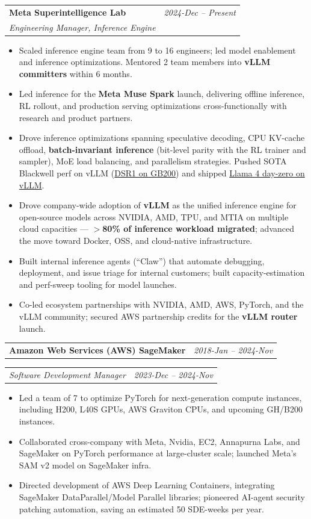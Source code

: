 \documentclass[letterpaper,10pt]{article}
\makeatletter
\newcommand{\resumeSubheading}[4]{
  \vspace{-1pt}\item
    \begin{tabular*}{0.97\textwidth}[t]{l@{\extracolsep{\fill}}r}
      \textbf{#1} & \textit{#2} \\
      \textit{\small#3} & \textit{\small#4} \\
    \end{tabular*}\vspace{-5pt}
}
\newcommand{\resumeSubSubheading}[2]{
  \vspace{-1pt}\item
    \begin{tabular*}{0.97\textwidth}[t]{l@{\extracolsep{\fill}}r}
      \textit{\small#1} & \textit{\small#2} \\
    \end{tabular*}\vspace{-5pt}
}
\newcommand{\resumeCompanyHeading}[2]{
  \vspace{-1pt}\item
    \begin{tabular*}{0.97\textwidth}[t]{l@{\extracolsep{\fill}}r}
      \textbf{#1} & \textit{#2}
    \end{tabular*}\vspace{-5pt}
}
\newcommand{\resumeItemListStart}{\begin{itemize}[topsep=2pt,itemsep=1pt,parsep=0pt]}
\newcommand{\resumeItemListEnd}{\end{itemize}\vspace{-3pt}}
\makeatother
\begin{document}
    \resumeSubheading
      {Meta Superintelligence Lab}{2024-Dec -- Present}
      {Engineering Manager, Inference Engine}{}
      \resumeItemListStart
        \item Scaled inference engine team from 9 to 16 engineers; led model enablement and inference optimizations. Mentored 2 team members into \textbf{vLLM committers} within 6 months.
        \item Led inference for the \textbf{Meta Muse Spark} launch, delivering offline inference, RL rollout, and production serving optimizations cross-functionally with research and product partners.
        \item Drove inference optimizations spanning speculative decoding, CPU KV-cache offload, \textbf{batch-invariant inference} (bit-level parity with the RL trainer and sampler), MoE load balancing, and parallelism strategies. Pushed SOTA Blackwell perf on vLLM (\href{https://vllm.ai/blog/dsr1-gb200-part1}{DSR1 on GB200}) and shipped \href{https://vllm-project.github.io/2025/04/05/llama4.html}{Llama 4 day-zero on vLLM}.
        \item Drove company-wide adoption of \textbf{vLLM} as the unified inference engine for open-source models across NVIDIA, AMD, TPU, and MTIA on multiple cloud capacities --- \textbf{$>$80\% of inference workload migrated}; advanced the move toward Docker, OSS, and cloud-native infrastructure.
        \item Built internal inference agents (``Claw'') that automate debugging, deployment, and issue triage for internal customers; built capacity-estimation and perf-sweep tooling for model launches.
        \item Co-led ecosystem partnerships with NVIDIA, AMD, AWS, PyTorch, and the vLLM community; secured AWS partnership credits for the \textbf{vLLM router} launch.
      \resumeItemListEnd

    \resumeCompanyHeading
      {Amazon Web Services (AWS) SageMaker}{2018-Jan -- 2024-Nov}
      \resumeSubSubheading{Software Development Manager}{2023-Dec -- 2024-Nov}
      \resumeItemListStart
        \item Led a team of 7 to optimize PyTorch for next-generation compute instances, including H200, L40S GPUs, AWS Graviton CPUs, and upcoming GH/B200 instances.
        \item Collaborated cross-company with Meta, Nvidia, EC2, Annapurna Labs, and SageMaker on PyTorch performance at large-cluster scale; launched Meta's SAM v2 model on SageMaker infra.
        \item Directed development of AWS Deep Learning Containers, integrating SageMaker DataParallel/Model Parallel libraries; pioneered AI-agent security patching automation, saving an estimated 50 SDE-weeks per year.
      \resumeItemListEnd
\end{document}

